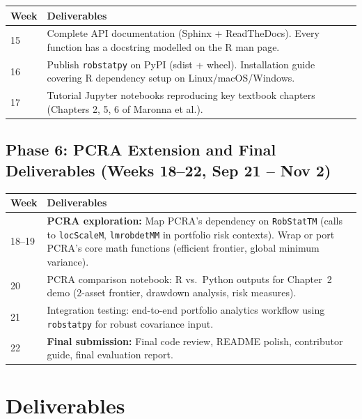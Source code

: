 \documentclass[11pt, a4paper]{article}
\begin{document}
\begin{tabularx}{\linewidth}{@{} l X @{}}
  \toprule
  \textbf{Week} & \textbf{Deliverables} \\
  \midrule
  15 & Complete API documentation (Sphinx + ReadTheDocs).
     Every function has a docstring modelled on the R man page. \\
  16 & Publish \texttt{robstatpy} on PyPI (sdist + wheel).
     Installation guide covering R dependency setup on
     Linux/macOS/Windows. \\
  17 & Tutorial Jupyter notebooks reproducing key textbook chapters
     (Chapters 2, 5, 6 of Maronna et al.). \\
  \bottomrule
\end{tabularx}

\subsection{Phase 6: PCRA Extension and Final Deliverables (Weeks 18--22, Sep 21 -- Nov 2)}

\begin{tabularx}{\linewidth}{@{} l X @{}}
  \toprule
  \textbf{Week} & \textbf{Deliverables} \\
  \midrule
  18--19 & \textbf{PCRA exploration:}
     Map PCRA's dependency on \texttt{RobStatTM} (calls to
     \texttt{locScaleM}, \texttt{lmrobdetMM} in portfolio risk
     contexts).
     Wrap or port PCRA's core math functions (efficient frontier,
     global minimum variance). \\
  20 & PCRA comparison notebook: R vs.\ Python outputs for Chapter~2
     demo (2-asset frontier, drawdown analysis, risk measures). \\
  21 & Integration testing: end-to-end portfolio analytics workflow
     using \texttt{robstatpy} for robust covariance input. \\
  22 & \textbf{Final submission:}
     Final code review, README polish, contributor guide,
     final evaluation report. \\
  \bottomrule
\end{tabularx}

\section{Deliverables}
\end{document}
